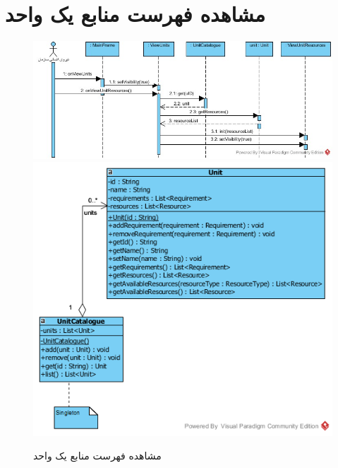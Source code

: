 \section{مشاهده فهرست منابع یک واحد}
\begin{figure}[H]
	\centering
	\includegraphics[scale=0.7]{img/sequence-design/ViewListOfResources}
	\includegraphics[scale=0.7]{img/sequence-design/ViewListOfResourcesC}
	\caption{مشاهده فهرست منابع یک واحد}
\end{figure}

